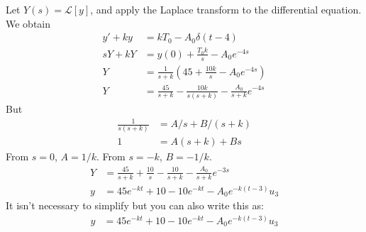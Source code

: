 \ifnum {} {\color{DarkBlue} 
    Let $Y (s) = \mathcal L[y]$, and apply the Laplace transform to the differential equation. We obtain
    \begin{align}
        y' + ky &= kT_0 - A_0 \delta(t-4) \\     
        sY + kY &= y(0) + \frac{T_0k}{s} - A_0e^{-4s} \\
        Y &= \frac{1}{s+k} \left( 45 + \frac{10k}{s} - A_0e^{-4s} \right) \\ 
        Y &= \frac{45}{s+k} - \frac{10k}{s(s+k)} - \frac{A_0}{s+k} e^{-4s} 
    \end{align}
    But 
    \begin{align}
        \frac{1}{s(s+k)} &= A/s + B/(s+k) \\
        1 &= A(s+k) + Bs
    \end{align}
    From $s=0$, $A=1/k$. From $s=-k$, $B = -1/k.$
    \begin{align}
            Y &= \frac{45}{s+k} + \frac{10}{s} - \frac{10}{s+k} - \frac{A_0}{s+k} e^{-3s} \\
            y &= 45 e^{-kt} + 10 - 10e^{-kt} - A_0e^{-k(t-3)}u_3
    \end{align}    
    It isn't necessary to simplify but you can also write this as:
    \begin{align}
        y &= 45 e^{-kt} + 10 - 10e^{-kt} - A_0e^{-k(t-3)}u_3
    \end{align}     
    } 
    \else 
    \fi
\fi



